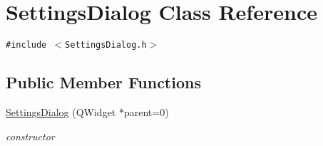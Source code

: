 \hypertarget{classSettingsDialog}{
\section{SettingsDialog Class Reference}
\label{classSettingsDialog}
}
{\tt \#include $<$SettingsDialog.h$>$}

\subsection*{Public Member Functions}
\begin{CompactItemize}
\item 
\hypertarget{classSettingsDialog_9933956b777b2c0451e9119581cc22fb}{
\hyperlink{classSettingsDialog_9933956b777b2c0451e9119581cc22fb}{SettingsDialog} (QWidget $\ast$parent=0)}
\label{classSettingsDialog_9933956b777b2c0451e9119581cc22fb}

\begin{CompactList}\small\item\em constructor \item\end{CompactList}\end{CompactItemize}
